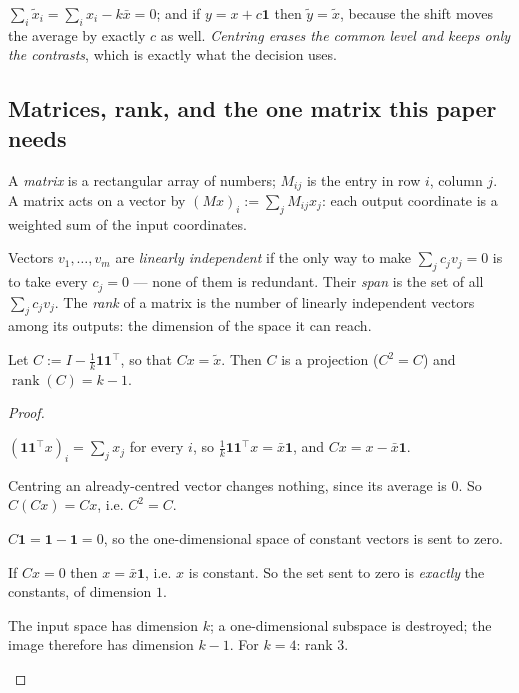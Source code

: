  $\sum_i \tilde x_i = \sum_i x_i - k\bar x = 0$;
and if $y = x + c\mathbf{1}$ then $\tilde y = \tilde x$, because the shift moves
the average by exactly $c$ as well. \emph{Centring erases the common level and
keeps only the contrasts}, which is exactly what the decision uses.

\subsection{Matrices, rank, and the one matrix this paper needs}

A \emph{matrix} is a rectangular array of numbers; $M_{ij}$ is the entry in row
$i$, column $j$. A matrix acts on a vector by
$(Mx)_i := \sum_j M_{ij}x_j$: each output coordinate is a weighted sum of the
input coordinates.

\begin{definition}
Vectors $v_1,\dots,v_m$ are \emph{linearly independent} if the only way to make
$\sum_j c_j v_j = 0$ is to take every $c_j = 0$ --- none of them is redundant. Their
\emph{span} is the set of all $\sum_j c_j v_j$. The \emph{rank} of a matrix is the
number of linearly independent vectors among its outputs: the dimension of the
space it can reach.
\end{definition}

\begin{lemma}
\label{lem:centrank}
Let $C := I - \tfrac1k\mathbf{1}\mathbf{1}^\top$, so that $Cx = \tilde x$. Then
$C$ is a projection ($C^2=C$) and $\operatorname{rank}(C)=k-1$.
\end{lemma}
\begin{proof}
\begin{steps}
\item $(\mathbf{1}\mathbf{1}^\top x)_i = \sum_j x_j$
for every $i$, so $\tfrac1k \mathbf{1}\mathbf{1}^\top x = \bar x\mathbf{1}$, and
$Cx = x - \bar x \mathbf{1}$.
\item Centring an already-centred vector changes
nothing, since its average is $0$. So $C(Cx)=Cx$, i.e. $C^2=C$.
\item $C\mathbf{1} = \mathbf{1}-\mathbf{1}=0$, so the
one-dimensional space of constant vectors is sent to zero.
\item If $Cx=0$ then $x=\bar x\mathbf{1}$, i.e. $x$ is
constant. So the set sent to zero is \emph{exactly} the constants, of dimension
$1$.
\item The input space has dimension $k$; a one-dimensional
subspace is destroyed; the image therefore has dimension $k-1$. For $k=4$:
rank $3$.
\end{steps}
\end{proof}

